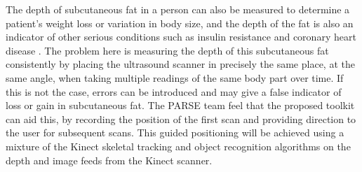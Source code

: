 The depth of subcutaneous fat in a person can also be measured to determine a patient's weight loss or variation in body size, and the depth of the fat is also an indicator of other serious conditions such as insulin resistance \cite{Goodpaster1997} and coronary heart disease \cite{Ducimetiere1986}. The problem here is measuring the depth of this subcutaneous fat consistently by placing the ultrasound scanner in precisely the same place, at the same angle, when taking multiple readings of the same body part over time. If this is not the case, errors can be introduced and may give a false indicator of loss or gain in subcutaneous fat. The PARSE team feel that the proposed toolkit can aid this, by recording the position of the first scan and providing direction to the user for subsequent scans. This guided positioning will be achieved using a mixture of the Kinect skeletal tracking and object recognition algorithms on the depth and image feeds from the Kinect scanner.\\ 